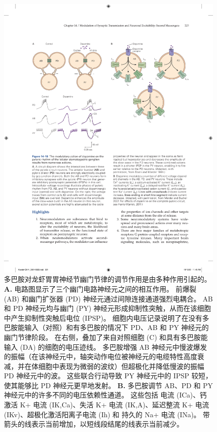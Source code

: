 \begin{figure}[htbp]
	\centering
	\includegraphics[width=0.95\linewidth]{chap14/fig_14_13}
	\caption{多巴胺对龙虾胃胃神经节幽门节律的调节作用是由多种作用引起的。
		\textbf{A.} 电路图显示了三个幽门电路神经元之间的相互作用。
		前爆裂 (AB) 和幽门扩张器 (PD) 神经元通过间隙连接通道强烈电耦合。
		AB 和 PD 神经元均与幽门 (PY) 神经元形成抑制性突触，从而在该细胞中产生抑制性突触后电位 (IPSP)。
		细胞内电压记录说明了在没有多巴胺能输入（对照）和有多巴胺的情况下 PD、AB 和 PY 神经元的幽门节律阶段。
		在右侧，叠加了来自对照细胞 (C) 和具有多巴胺能输入 (DA) 的细胞的电压迹线。
		多巴胺增强 AB 神经元中慢波爆发的振幅（在该神经元中，轴突动作电位被神经元的电缆特性高度衰减，并在体细胞中表现为微弱的波纹）但超极化并降低慢波的振幅 PD 神经元中的波。
		这些联合行动导致 PY 神经元中的 IPSP 较短，使其能够比 PD 神经元更早地发射\cite{eisen1984mechanism}。
		\textbf{B.} 多巴胺调节 AB、PD 和 PY 神经元中的许多不同的电压依赖性通道。
		这些包括  电流 (ICa)、钙激活 K+ 电流 (IK,Ca)、失活 K+ 电流 (IK,A)、延迟整流 K+ 电流 (IKv)、超极化激活阳离子电流 (Ih) 和 持久的 Na+ 电流 (INa)。
		带箭头的线表示当前增加，以短线段结尾的线表示当前减少\cite{marder2007understanding,harris2011neuromodulation}。}
	\label{fig:14_13}
\end{figure}


